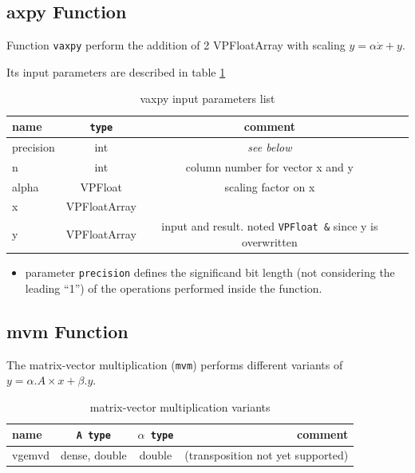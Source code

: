 \documentclass[11pt]{report}
\begin{document}
  \subsection{axpy Function}
  Function \texttt{vaxpy} perform the addition of 2 VPFloatArray with scaling $ y = \alpha \dot x + y$. 


Its input parameters are described in table \ref{tab:tablevaxpy}
\begin{table}[h!]
  \begin{center}
    \caption{vaxpy input parameters list}
    \label{tab:tablevaxpy}
    \begin{tabular}{l|c|c|r} %
      \textbf{name} & \texttt{type} & \textbf{comment}\\
      \hline
      precision & int & \emph{see below} \\ 
      \hline
      n & int & column number for vector x and y \\ 
      \hline
      alpha & VPFloat & scaling factor on x \\ 
      \hline
      x & VPFloatArray &  \\ 
      \hline
      y & VPFloatArray & input and result. noted \texttt{VPFloat \&} since y is overwritten \\ 
      \hline
    \end{tabular}
  \end{center}
\end{table}
\begin{itemize}
\item parameter \texttt{precision} defines the significand bit length (not considering the leading ``1'') of the operations performed inside the function. 
  \end{itemize}

  
\subsection{mvm Function}
The matrix-vector multiplication (\texttt{mvm}) performs different variants of $ y = \alpha . A \times x + \beta . y$.
\begin{table}[h!]
  \begin{center}
    \caption{matrix-vector multiplication variants}
    \label{tab:tablemvm}
    \begin{tabular}{l|c|c|r} %
      \textbf{name} & \texttt{A type} & \texttt{$\alpha$ type} & \textbf{comment}\\
      \hline
      vgemvd & dense, double & double & (transposition not yet supported)\\ 
      \hline
    \end{tabular}
  \end{center}
\end{table}
\end{document}
